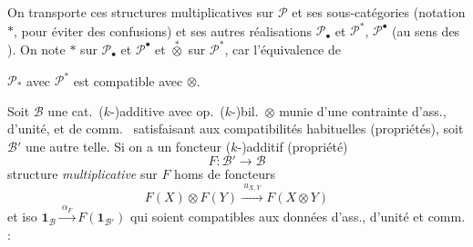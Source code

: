 \documentclass[11pt,a4paper]{article}
\begin{document}
On transporte ces structures multiplicatives sur $\mathcal{P}$ et ses
sous-catégories (notation $*$, pour éviter des confusions) et ses autres
réalisations $\mathcal{P}_{\bullet}$ et $\mathcal{P}^{*}$,
$\mathcal{P}^{\bullet}$ (au sens des \ill{} ).
On note $*$ sur $\mathcal{P}_{\bullet}$ et $\mathcal{P}^{\bullet}$ et
$\overset{*}{\otimes}$ sur $\mathcal{P}^{*}$, car l'équivalence \ill{} de

$\mathcal{P}_{*}$ avec $\mathcal{P}^{*}$ est compatible avec $\otimes$.

Soit $\mathcal{B}$ une cat.\ ($k$-)additive avec op.\ ($k$-)bil.\
$\otimes$  munie d'une
contrainte \add{(données)} d'ass., d'unité, et de comm.\ \struck{\ill{}}
satisfaisant aux compatibilités habituelles (propriétés), soit
$\mathcal{B}'$ une autre telle. Si on a un foncteur ($k$-)additif
(propriété)
\[
F : \mathcal{B}' \longrightarrow \mathcal{B}
\]
 structure \emph{multiplicative} sur $F$ \ill{} homs de
foncteurs
\[
F(X) \otimes F(Y) \xrightarrow{\ u_{X,Y}\ } F(X \otimes Y)
\]
et iso \struck{\ill{}}
$\mathbf{1}_{\mathcal{B}} \xrightarrow{\ \alpha_F\ } F(\mathbf{1}_{\mathcal{B}'})$
qui soient compatibles aux données d'ass., d'unité et comm. :


\end{document}
